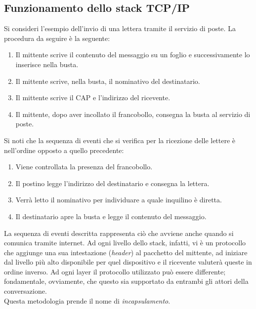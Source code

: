 \subsection{Funzionamento dello stack TCP/IP}
Si consideri l'esempio dell'invio di una lettera tramite il servizio di poste. La procedura da seguire è la seguente:

\begin{enumerate}
	\item Il mittente scrive il contenuto del messaggio su un foglio e successivamente lo inserisce nella busta.
	\item Il mittente scrive, nella busta, il nominativo del destinatario.
	\item Il mittente scrive il CAP e l'indirizzo del ricevente.
	\item Il mittente, dopo aver incollato il francobollo, consegna la busta al servizio di poste.
\end{enumerate}

Si noti che la sequenza di eventi che si verifica per la ricezione delle lettere è nell'ordine opposto a quello precedente:
\begin{enumerate}
	\item Viene controllata la presenza del francobollo.
	\item Il postino legge l'indirizzo del destinatario e consegna la lettera.
	\item Verrà letto il nominativo per individuare a quale inquilino è diretta.
	\item Il destinatario apre la busta e legge il contenuto del messaggio.
\end{enumerate}

La sequenza di eventi descritta rappresenta ciò che avviene anche quando si comunica tramite internet. Ad ogni livello dello stack, infatti, vi è un protocollo che aggiunge una sua intestazione (\textit{header}) al pacchetto del mittente, ad iniziare dal livello più alto disponibile per quel dispositivo e il ricevente  valuterà queste in ordine inverso. Ad ogni layer il protocollo utilizzato può essere differente; fondamentale, ovviamente, che questo sia supportato da entrambi gli attori della conversazione.\\
Questa metodologia prende il nome di \textit{incapsulamento}.
\\

